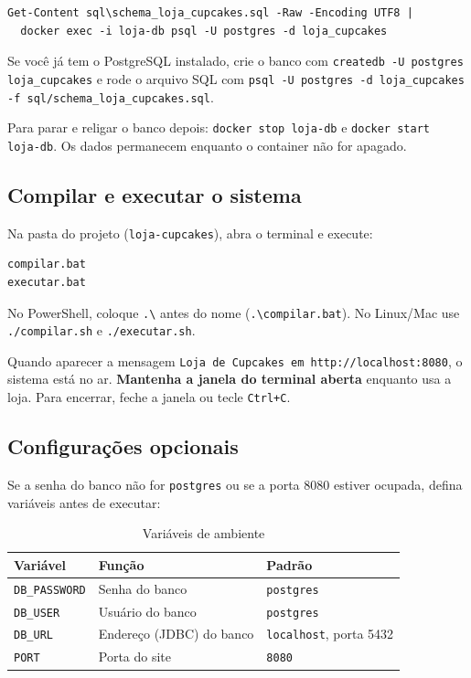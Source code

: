 \documentclass[12pt]{article}
\begin{document}
\begin{Verbatim}[fontsize=\footnotesize, frame=single]
Get-Content sql\schema_loja_cupcakes.sql -Raw -Encoding UTF8 |
  docker exec -i loja-db psql -U postgres -d loja_cupcakes
\end{Verbatim}

\begin{dica}
Se você já tem o PostgreSQL instalado, crie o banco com \texttt{createdb -U postgres loja\_cupcakes} e rode o arquivo SQL com \texttt{psql -U postgres -d loja\_cupcakes -f sql/schema\_loja\_cupcakes.sql}.
\end{dica}

Para parar e religar o banco depois: \texttt{docker stop loja-db} e \texttt{docker start loja-db}. Os dados permanecem enquanto o container não for apagado.

\subsection{Compilar e executar o sistema}

Na pasta do projeto (\texttt{loja-cupcakes}), abra o terminal e execute:

\begin{Verbatim}[fontsize=\footnotesize, frame=single]
compilar.bat
executar.bat
\end{Verbatim}

No PowerShell, coloque \texttt{.\textbackslash} antes do nome (\texttt{.\textbackslash compilar.bat}). No Linux/Mac use \texttt{./compilar.sh} e \texttt{./executar.sh}.

Quando aparecer a mensagem \texttt{Loja de Cupcakes em http://localhost:8080}, o sistema está no ar. \textbf{Mantenha a janela do terminal aberta} enquanto usa a loja. Para encerrar, feche a janela ou tecle \texttt{Ctrl+C}.

\subsection{Configurações opcionais}

Se a senha do banco não for \texttt{postgres} ou se a porta 8080 estiver ocupada, defina variáveis antes de executar:

\begin{table}[H]
\centering
\renewcommand{\arraystretch}{1.25}
\begin{tabular}{|l|p{5.2cm}|p{4.2cm}|}
\hline
\rowcolor{gray!30} \textbf{Variável} & \textbf{Função} & \textbf{Padrão} \\ \hline
\texttt{DB\_PASSWORD} & Senha do banco & \texttt{postgres} \\ \hline
\texttt{DB\_USER} & Usuário do banco & \texttt{postgres} \\ \hline
\texttt{DB\_URL} & Endereço (JDBC) do banco & \texttt{localhost}, porta 5432 \\ \hline
\texttt{PORT} & Porta do site & \texttt{8080} \\ \hline
\end{tabular}
\caption{Variáveis de ambiente}
\end{table}
\end{document}
